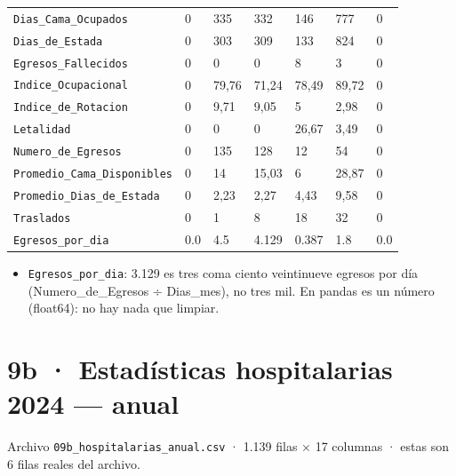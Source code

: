 \documentclass[10pt]{article}
\begin{document}
\begin{xltabular}{\linewidth}{@{}p{4.3cm} Y Y Y Y Y Y @{}}
\texttt{Dias\_\allowbreak{}Cama\_\allowbreak{}Ocupados} & 0 & 335 & 332 & 146 & 777 & 0 \\
\texttt{Dias\_\allowbreak{}de\_\allowbreak{}Estada} & 0 & 303 & 309 & 133 & 824 & 0 \\
\texttt{Egresos\_\allowbreak{}Fallecidos} & 0 & 0 & 0 & 8 & 3 & 0 \\
\texttt{Indice\_\allowbreak{}Ocupacional} & 0 & 79,76 & 71,24 & 78,49 & 89,72 & 0 \\
\texttt{Indice\_\allowbreak{}de\_\allowbreak{}Rotacion} & 0 & 9,71 & 9,05 & 5 & 2,98 & 0 \\
\texttt{Letalidad} & 0 & 0 & 0 & 26,67 & 3,49 & 0 \\
\texttt{Numero\_\allowbreak{}de\_\allowbreak{}Egresos} & 0 & 135 & 128 & 12 & 54 & 0 \\
\texttt{Promedio\_\allowbreak{}Cama\_\allowbreak{}Disponibles} & 0 & 14 & 15,03 & 6 & 28,87 & 0 \\
\texttt{Promedio\_\allowbreak{}Dias\_\allowbreak{}de\_\allowbreak{}Estada} & 0 & 2,23 & 2,27 & 4,43 & 9,58 & 0 \\
\texttt{Traslados} & 0 & 1 & 8 & 18 & 32 & 0 \\
\texttt{Egresos\_\allowbreak{}por\_\allowbreak{}dia} & 0.0 & 4.5 & 4.129 & 0.387 & 1.8 & 0.0 \\
\end{xltabular}
\normalsize

\begin{alertabox}
\begin{itemize}[leftmargin=1.4em,itemsep=2pt,topsep=2pt]
\item \texttt{Egresos\_\allowbreak{}por\_\allowbreak{}dia}: 3.129 es tres coma ciento veintinueve egresos por día (Numero\_de\_Egresos ÷ Dias\_mes), no tres mil. En pandas es un número (float64): no hay nada que limpiar.
\end{itemize}
\end{alertabox}

\clearpage
\hypertarget{base9b}{}
\section{9b · Estadísticas hospitalarias 2024 — anual}
\small Archivo \texttt{09b\_hospitalarias\_anual.csv} · 1.139 filas × 17 columnas · estas son 6 filas reales del archivo.\normalsize
\end{document}
